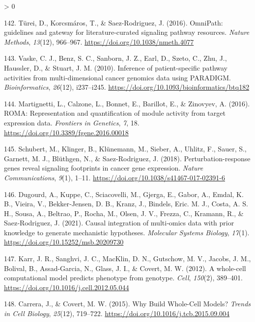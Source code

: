\documentclass[
  12pt,
]{book}
\newlength{\cslhangindent}
\newenvironment{CSLReferences}[2] %
 {%
  \setlength{\parindent}{0pt}
  \ifodd #1 \everypar{\setlength{\hangindent}{\cslhangindent}}\ignorespaces\fi
  \ifnum #2 > 0
  \setlength{\parskip}{#2\baselineskip}
  \fi
 }%
 {}
\begin{document}
\begin{CSLReferences}{1}{0}
\leavevmode\hypertarget{ref-Turei2016}{}%
142. Türei, D., Korcsmáros, T., \& Saez-Rodriguez, J. (2016). {OmniPath: guidelines and gateway for literature-curated signaling pathway resources}. \emph{Nature Methods}, \emph{13}(12), 966--967. \url{https://doi.org/10.1038/nmeth.4077}

\leavevmode\hypertarget{ref-Vaske2010}{}%
143. Vaske, C. J., Benz, S. C., Sanborn, J. Z., Earl, D., Szeto, C., Zhu, J., Haussler, D., \& Stuart, J. M. (2010). {Inference of patient-specific pathway activities from multi-dimensional cancer genomics data using PARADIGM}. \emph{Bioinformatics}, \emph{26}(12), i237--i245. \url{https://doi.org/10.1093/bioinformatics/btq182}

\leavevmode\hypertarget{ref-Martignetti2016}{}%
144. Martignetti, L., Calzone, L., Bonnet, E., Barillot, E., \& Zinovyev, A. (2016). {ROMA: Representation and quantification of module activity from target expression data}. \emph{Frontiers in Genetics}, \emph{7}, 18. \url{https://doi.org/10.3389/fgene.2016.00018}

\leavevmode\hypertarget{ref-Schubert2018}{}%
145. Schubert, M., Klinger, B., Klünemann, M., Sieber, A., Uhlitz, F., Sauer, S., Garnett, M. J., Blüthgen, N., \& Saez-Rodriguez, J. (2018). {Perturbation-response genes reveal signaling footprints in cancer gene expression}. \emph{Nature Communications}, \emph{9}(1), 1--11. \url{https://doi.org/10.1038/s41467-017-02391-6}

\leavevmode\hypertarget{ref-Dugourd2021}{}%
146. Dugourd, A., Kuppe, C., Sciacovelli, M., Gjerga, E., Gabor, A., Emdal, K. B., Vieira, V., Bekker‐Jensen, D. B., Kranz, J., Bindels, Eric. M. J., Costa, A. S. H., Sousa, A., Beltrao, P., Rocha, M., Olsen, J. V., Frezza, C., Kramann, R., \& Saez‐Rodriguez, J. (2021). {Causal integration of multi‐omics data with prior knowledge to generate mechanistic hypotheses}. \emph{Molecular Systems Biology}, \emph{17}(1). \url{https://doi.org/10.15252/msb.20209730}

\leavevmode\hypertarget{ref-Karr2012}{}%
147. Karr, J. R., Sanghvi, J. C., MacKlin, D. N., Gutschow, M. V., Jacobs, J. M., Bolival, B., Assad-Garcia, N., Glass, J. I., \& Covert, M. W. (2012). {A whole-cell computational model predicts phenotype from genotype}. \emph{Cell}, \emph{150}(2), 389--401. \url{https://doi.org/10.1016/j.cell.2012.05.044}

\leavevmode\hypertarget{ref-Carrera2015}{}%
148. Carrera, J., \& Covert, M. W. (2015). {Why Build Whole-Cell Models?} \emph{Trends in Cell Biology}, \emph{25}(12), 719--722. \url{https://doi.org/10.1016/j.tcb.2015.09.004}


\end{CSLReferences}
\end{document}
